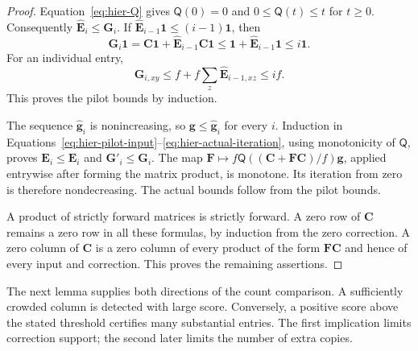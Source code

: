 \documentclass[11pt]{article}
\numberwithin{equation}{section}
\theoremstyle{definition}
\theoremstyle{remark}
\begin{document}
\begin{proof}
Equation~\eqref{eq:hier-Q} gives ${\mathsf{Q}}(0)=0$ and
$0\leq {\mathsf{Q}}(t)\leq t$ for $t\ge0$.
Consequently $\widehat {\mathbf{E}}_i\leq {\mathbf{G}}_i$.  If
$\widehat {\mathbf{E}}_{i-1}\mathbf 1\leq(i-1)\mathbf 1$, then
\[
 {\mathbf{G}}_i\mathbf 1={\mathbf{C}}\mathbf 1+\widehat {\mathbf{E}}_{i-1}{\mathbf{C}}\mathbf 1
       \leq\mathbf 1+\widehat {\mathbf{E}}_{i-1}\mathbf 1
       \leq i\mathbf 1.
\]
For an individual entry,
\[
 {\mathbf{G}}_{i,xy}\leq f+f\sum_z\widehat {\mathbf{E}}_{i-1,xz}\leq if.
\]
This proves the pilot bounds by induction.

The sequence $\widehat {\mathbf{g}}_i$ is nonincreasing, so
${\mathbf{g}}\leq\widehat {\mathbf{g}}_i$ for every $i$.  Induction in
Equations~\eqref{eq:hier-pilot-input}--\eqref{eq:hier-actual-iteration},
using monotonicity of ${\mathsf{Q}}$, proves ${\mathbf{E}}_i\leq\widehat {\mathbf{E}}_i$ and
${\mathbf{G}}'_i\leq {\mathbf{G}}_i$.  The map
${\mathbf{F}}\mapsto f{\mathsf{Q}}(({\mathbf{C}}+{\mathbf{F}}{\mathbf{C}})/f){\mathbf{g}}$, applied entrywise after forming the matrix
product, is monotone.  Its iteration from zero is therefore
nondecreasing.  The actual bounds follow from the pilot bounds.

A product of strictly forward matrices is strictly forward.  A zero row
of ${\mathbf{C}}$ remains a zero row in all these formulas, by induction from the
zero correction.  A zero column of ${\mathbf{C}}$ is a zero column of every product
of the form ${\mathbf{F}}{\mathbf{C}}$ and hence of every input and correction.  This proves
the remaining assertions.
\end{proof}

The next lemma supplies both directions of the count comparison. A sufficiently crowded column is detected with large score. Conversely, a positive score above the stated threshold certifies many substantial entries. The first implication limits correction support; the second later limits the number of extra copies.
\end{document}
